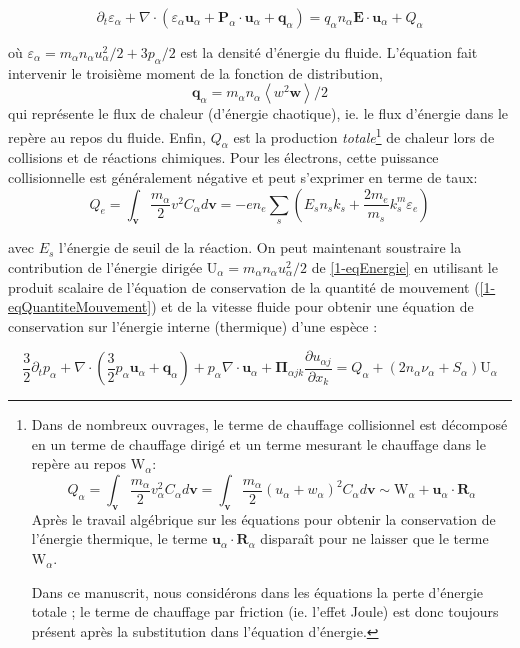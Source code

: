 \begin{refsection}
\begin{equation}
\label{1-eqEnergie}
\partial_t \varepsilon_\alpha+
\nabla\cdot\left(\varepsilon_\alpha\mathbf{u}_\alpha+\mathbf
P_\alpha\cdot\mathbf{u}_\alpha + \mathbf q_\alpha\right) =q_\alpha
n_\alpha\mathbf E\cdot
\mathbf{u}_\alpha+Q_\alpha
\end{equation}

où $\varepsilon_\alpha=m_\alpha n_\alpha u_\alpha^2/2+3p_\alpha/2$ est
la densité d'énergie du fluide. L'équation fait intervenir le troisième moment
de la fonction de distribution, $$\mathbf q_\alpha=m_\alpha
n_\alpha\left<w^2\mathbf w\right>/2$$ qui représente le flux de chaleur
(d'énergie chaotique), ie. le flux d'énergie dans le repère au repos du fluide. 
Enfin, $Q_\alpha$ est la production \emph{totale}\footnote{Dans de nombreux ouvrages, le terme de chauffage
collisionnel est décomposé en un terme de chauffage dirigé et un terme mesurant
le chauffage dans le repère au repos $\text{W}_\alpha$: $$Q_\alpha=\int_{\mathbf
v}\frac{m_\alpha}{2}v_\alpha^2C_\alpha d\mathbf v=\int_{\mathbf
v}\frac{m_\alpha}{2}(u_\alpha+w_\alpha)^2C_\alpha d\mathbf
v\sim\text{W}_\alpha+\mathbf u_\alpha\cdot\mathbf R_\alpha $$ Après le travail
algébrique sur les équations pour obtenir la conservation de l'énergie
thermique, le terme $\mathbf u_\alpha\cdot\mathbf R_\alpha$ disparaît pour
ne laisser que le terme $\text{W}_\alpha$. 

Dans ce manuscrit, nous
considérons dans les équations la perte d'énergie totale ; le terme de
chauffage par friction (ie. l'effet Joule) est donc toujours présent après la
substitution dans l'équation d'énergie.} de chaleur lors de collisions et de
réactions chimiques.
Pour les électrons, cette puissance collisionnelle est généralement négative et peut s'exprimer en terme de taux:
\begin{equation}
	Q_e=\int_{\mathbf
	v}\frac{m_\alpha}{2}v^2C_\alpha d\mathbf
	v=-en_e\sum_{s}\left(E_sn_sk_s+\frac{2m_e}{m_s}k^m_s\varepsilon_e\right)
\end{equation}

avec $E_s$ l'énergie de seuil de la réaction. On peut maintenant soustraire la
contribution de l'énergie dirigée $\text{U}_{\alpha}=m_\alpha n_\alpha
u_\alpha^2/2$ de \eqref{1-eqEnergie} en utilisant le produit scalaire de l'équation de
conservation de la quantité de mouvement (\eqref{1-eqQuantiteMouvement}) et de
la vitesse fluide pour obtenir une équation de conservation sur l'énergie
interne (thermique) d'une espèce :

\begin{equation}
\label{1-eqEnergieInterne}
\frac{3}{2}\partial_t p_\alpha + 
\nabla\cdot\left(\frac{3}{2}p_\alpha
\mathbf{u}_\alpha+\mathbf q_\alpha\right)+p_\alpha\nabla\cdot\mathbf u_\alpha
+\boldsymbol{\Pi}_{\alpha j k}\frac{\partial u_{\alpha j}}{\partial{x_k}} =
{Q_\alpha}+(2n_\alpha\nu_\alpha+S_\alpha)\text{U}_\alpha
\end{equation}


\end{refsection}

